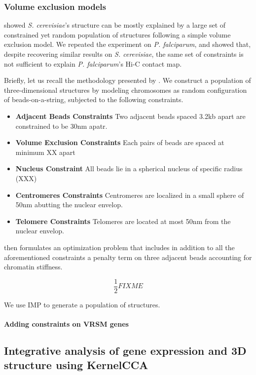 \documentclass[letterpaper,12pt]{article}
\begin{document}
\subsubsection{Volume exclusion models}

\citet{tjong:physical} showed \textit{S. cerevisiae}'s structure can be mostly
explained by a large set of constrained yet random population of structures
following a simple volume exclusion model. We repeated the experiment on {\em
P. falciparum}, and showed that, despite recovering similar results on {\em S.
cerevisiae}, the same set of constraints is not sufficient to explain {\em P.
falciparum}'s Hi-C contact map. 

Briefly, let us recall the methodology presented by \citet{tjong:physical}. We
construct a population of three-dimensional structures by modeling chromosomes
as random configuration of beads-on-a-string, subjected to the following constraints.

\begin{itemize}
\item \textbf{Adjacent Beads Constraints} Two adjacent beads spaced 3.2kb apart are constrained to be 30nm apatr.
\item \textbf{Volume Exclusion Constraints} Each pairs of beads are spaced at minimum XX apart
\item \textbf{Nucleus Constraint} All beads lie in a spherical nucleus of specific
radius (XXX)
\item \textbf{Centromeres Constraints} Centromeres are localized in a small sphere of
50nm abutting the nuclear envelop.
\item \textbf{Telomere Constraints} Telomeres are located at most 50nm from the nuclear envelop.
\end{itemize}

\citet{tjong:physical} then formulates an optimization problem that includes
in addition to all the aforementioned constraints a penalty term on three
adjacent beads accounting for chromatin stiffness.

$$
\frac{1}{2} FIXME
$$

We use IMP to generate a population of structures.

\paragraph{Adding constraints on VRSM genes}

\subsection{Integrative analysis of gene expression and 3D structure using KernelCCA}
\end{document}
